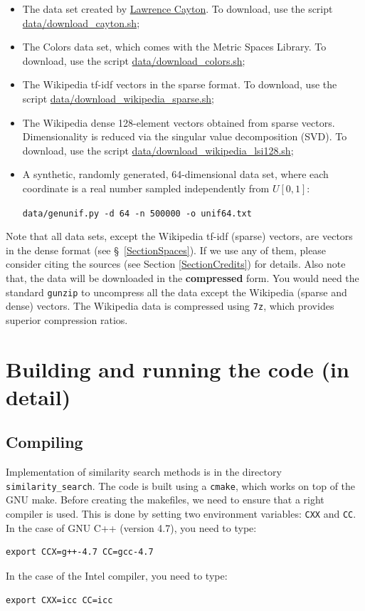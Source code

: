 \documentclass[runningheads,a4paper]{llncs}
\newcommand{\ttt}[1]{\texttt{#1}}
\begin{document}
{\begin{itemize} 
\item The data set created by \href{http://lcayton.com}{Lawrence Cayton}. 
To download, use the script 
\href{https://github.com/searchivarius/NonMetricSpaceLib/tree/master/data/download_cayton.sh}{data/download\_cayton.sh};
\item The Colors data set, which comes with the Metric Spaces Library\cite{LibMetricSpace}.
To download, use the script 
\href{https://github.com/searchivarius/NonMetricSpaceLib/tree/master/data/download_colors.sh}{data/download\_colors.sh};
\item The Wikipedia tf-idf vectors in the sparse format.
To download, use the script 
\href{https://github.com/searchivarius/NonMetricSpaceLib/tree/master/data/download_wikipedia_sparse.sh}{data/download\_wikipedia\_sparse.sh};
\item The Wikipedia dense 128-element vectors obtained from sparse vectors.
Dimensionality is reduced via the singular value decomposition (SVD).
To download, use the script 
\href{https://github.com/searchivarius/NonMetricSpaceLib/tree/master/data/download_wikipedia_lsi128.sh}{data/download\_wikipedia\_lsi128.sh};
\item A synthetic, randomly generated, 64-dimensional data set, where each coordinate is a real number sampled independently from $U[0,1]$:  

\ttt{data/genunif.py -d 64 -n 500000 -o unif64.txt}
\end{itemize}

Note that all data sets, except the Wikipedia tf-idf (sparse) vectors, 
are vectors in the dense format (see \S~\ref{SectionSpaces}).
If we use any of them, please consider citing the sources (see Section \ref{SectionCredits}) for details.
Also note that, the data will be downloaded in the \textbf{compressed} form.
You would need the standard \ttt{gunzip} to uncompress all the data except
the Wikipedia (sparse and dense) vectors.
The Wikipedia data is compressed using \ttt{7z}, which provides 
superior compression ratios.

\section{Building and running the code (in detail)}\label{SectionBuild}
\subsection{Compiling}
Implementation of similarity search methods is in the directory \ttt{similarity\_search}.
The code is built using a \ttt{cmake}, which works on top of the GNU make.
Before creating the makefiles, we need to ensure that a right compiler is used.
This is done by setting two environment variables: \ttt{CXX} and \ttt{CC}.
In the case of GNU C++ (version 4.7), you need to type:
\begin{verbatim}
export CCX=g++-4.7 CC=gcc-4.7 
\end{verbatim}
In the case of the Intel compiler, you need to type:
\begin{verbatim}
export CXX=icc CC=icc 
\end{verbatim}


}
\end{document}
